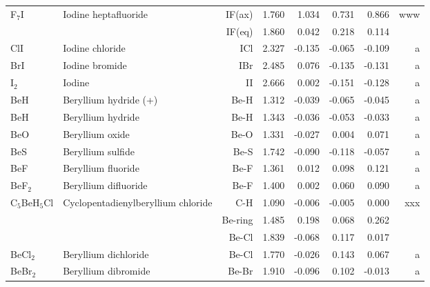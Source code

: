 \begin{table}
\begin{center}
\begin{tabular}{llrrrrrr}
 F$_7$I         & Iodine heptafluoride               &IF(ax)        &     1.760   &     1.034 &     0.731 &     0.866 &   www \\
             &                                    &IF(eq)        &     1.860   &     0.042 &     0.218 &     0.114 &       \\
 ClI         & Iodine chloride                    &ICl           &     2.327   &    -0.135 &    -0.065 &    -0.109 &     a \\
 BrI         & Iodine bromide                     &IBr           &     2.485   &     0.076 &    -0.135 &    -0.131 &     a \\
 I$_2$          & Iodine                             &II            &     2.666   &     0.002 &    -0.151 &    -0.128 &     a \\
 BeH         & Beryllium hydride (+)              &Be-H          &     1.312   &    -0.039 &    -0.065 &    -0.045 &     a \\
 BeH         & Beryllium hydride                  &Be-H          &     1.343   &    -0.036 &    -0.053 &    -0.033 &     a \\
 BeO         & Beryllium oxide                    &Be-O          &     1.331   &    -0.027 &     0.004 &     0.071 &     a \\
 BeS         & Beryllium sulfide                  &Be-S          &     1.742   &    -0.090 &    -0.118 &    -0.057 &     a \\
 BeF         & Beryllium fluoride                 &Be-F          &     1.361   &     0.012 &     0.098 &     0.121 &     a \\
 BeF$_2$        & Beryllium difluoride               &Be-F          &     1.400   &     0.002 &     0.060 &     0.090 &     a \\
 C$_5$BeH$_5$Cl    & Cyclopentadienylberyllium chloride &C-H           &     1.090   &    -0.006 &    -0.005 &     0.000 &   xxx \\
             &                                    &Be-ring       &     1.485   &     0.198 &     0.068 &     0.262 &       \\
             &                                    &Be-Cl         &     1.839   &    -0.068 &     0.117 &     0.017 &       \\
 BeCl$_2$       & Beryllium dichloride               &Be-Cl         &     1.770   &    -0.026 &     0.143 &     0.067 &     a \\
 BeBr$_2$       & Beryllium dibromide                &Be-Br         &     1.910   &    -0.096 &     0.102 &    -0.013 &     a \\

\end{tabular}
\end{center}
\end{table}
